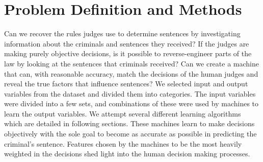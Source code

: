 \documentclass[11pt,letter]{article}
\begin{document}
\section{Problem Definition and Methods}
Can we recover the rules judges use to determine sentences by investigating information about the criminals and sentences they received? If the judges are making purely objective decisions, is it possible to reverse-engineer parts of the law by looking at the sentences that criminals received? Can we create a machine that can, with reasonable accuracy, match the decisions of the human judges and reveal the true factors that influence sentences?
We selected input and output variables from the dataset and divided them into categories. The input variables were divided into a few sets, and combinations of these were used by machines to learn the output variables. We attempt several different learning algorithms which are detailed in following sections. These machines learn to make decisions objectively with the sole goal to become as accurate as possible in predicting the criminal's sentence. Features chosen by the machines to be the most heavily weighted in the decisions shed light into the human decision making processes. 
\end{document}
